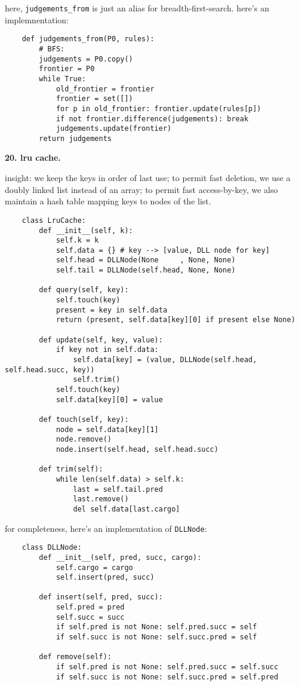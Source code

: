 \documentclass{article}
\newcommand{\cd}{\texttt}
\begin{document}
\vfill
\noindent here, \cd{judgements\_from} is just an alias for
breadth-first-search.  here's an implemnentation:
\begin{verbatim}
    def judgements_from(P0, rules):
        # BFS: 
        judgements = P0.copy()
        frontier = P0
        while True:
            old_frontier = frontier
            frontier = set([])
            for p in old_frontier: frontier.update(rules[p]) 
            if not frontier.difference(judgements): break
            judgements.update(frontier)
        return judgements 
\end{verbatim}

\newpage
    \par\noindent\hspace{-1cm}
    \textbf{20. lru cache.}

        insight: we keep the keys in order of last use; to permit fast
                 deletion, we use a doubly linked list instead of an array;
                 to permit fast access-by-key, we also maintain a hash
                 table mapping keys to nodes of the list.
\begin{verbatim}
    class LruCache:
        def __init__(self, k):
            self.k = k
            self.data = {} # key --> [value, DLL node for key]
            self.head = DLLNode(None     , None, None) 
            self.tail = DLLNode(self.head, None, None)

        def query(self, key): 
            self.touch(key)
            present = key in self.data
            return (present, self.data[key][0] if present else None) 

        def update(self, key, value): 
            if key not in self.data:
                self.data[key] = (value, DLLNode(self.head, self.head.succ, key)) 
                self.trim()
            self.touch(key)
            self.data[key][0] = value

        def touch(self, key):
            node = self.data[key][1] 
            node.remove()
            node.insert(self.head, self.head.succ)

        def trim(self):
            while len(self.data) > self.k:
                last = self.tail.pred
                last.remove()
                del self.data[last.cargo] 
\end{verbatim}

\vfill
\noindent for completeness, here's an implementation of \cd{DLLNode}: 
\begin{verbatim}
    class DLLNode:
        def __init__(self, pred, succ, cargo):  
            self.cargo = cargo
            self.insert(pred, succ)

        def insert(self, pred, succ):
            self.pred = pred
            self.succ = succ
            if self.pred is not None: self.pred.succ = self
            if self.succ is not None: self.succ.pred = self

        def remove(self): 
            if self.pred is not None: self.pred.succ = self.succ
            if self.succ is not None: self.succ.pred = self.pred
\end{verbatim}
\end{document}
